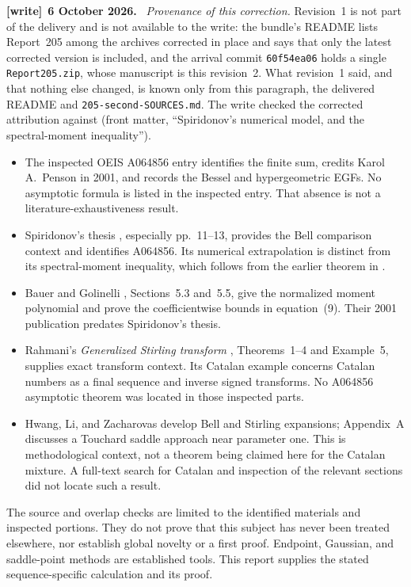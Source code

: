 \documentclass[11pt,letterpaper]{article}
\numberwithin{equation}{section}
\theoremstyle{remark}\newtheorem{remark}[theorem]{Remark}
\newcommand{\file}[1]{\nolinkurl{#1}}
\newenvironment{writenote}[1][]{\par\smallskip\begingroup\small
 \noindent\textbf{[write]}\if\relax\detokenize{#1}\relax\else~\textbf{#1.}\fi\ }%
 {\par\endgroup\smallskip}
\begin{document}
\begin{writenote}[6 October 2026]
\emph{Provenance of this correction.} Revision~1 is not part of the delivery and is not available to the write: the bundle's README lists Report~205 among the archives corrected in place and says that only the latest corrected version is included, and the arrival commit \texttt{60f54ea06} holds a single \file{Report205.zip}, whose manuscript is this revision~2. What revision~1 said, and that nothing else changed, is known only from this paragraph, the delivered README and \file{205-second-SOURCES.md}. The write checked the corrected attribution against \cite{bauer} (front matter, ``Spiridonov's numerical model, and the spectral-moment inequality'').
\end{writenote}
\begin{itemize}
 \item The inspected OEIS A064856 entry \cite{oeisA064856} identifies the finite sum, credits Karol A.~Penson in 2001, and records the Bessel and hypergeometric EGFs. No asymptotic formula is listed in the inspected entry. That absence is not a literature-exhaustiveness result.
 \item Spiridonov's thesis \cite{spiridonov}, especially pp.~11--13, provides the Bell comparison context and identifies A064856. Its numerical extrapolation is distinct from its spectral-moment inequality, which follows from the earlier theorem in \cite{bauer}.
 \item Bauer and Golinelli \cite{bauer}, Sections~5.3 and~5.5, give the normalized moment polynomial and prove the coefficientwise bounds in equation~(9). Their 2001 publication predates Spiridonov's thesis.
 \item Rahmani's \emph{Generalized Stirling transform} \cite{rahmani}, Theorems~1--4 and Example~5, supplies exact transform context. Its Catalan example concerns Catalan numbers as a final sequence and inverse signed transforms. No A064856 asymptotic theorem was located in those inspected parts.
 \item Hwang, Li, and Zacharovas \cite{hwang} develop Bell and Stirling expansions; Appendix~A discusses a Touchard saddle approach near parameter one. This is methodological context, not a theorem being claimed here for the Catalan mixture. A full-text search for Catalan and inspection of the relevant sections did not locate such a result.
\end{itemize}
The source and overlap checks are limited to the identified materials and inspected portions. They do not prove that this subject has never been treated elsewhere, nor establish global novelty or a first proof. Endpoint, Gaussian, and saddle-point methods are established tools. This report supplies the stated sequence-specific calculation and its proof.
\end{document}
